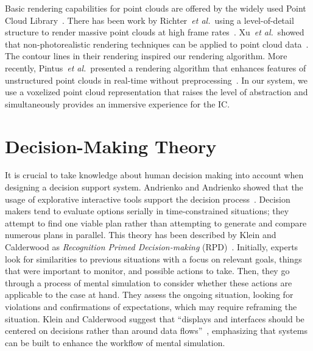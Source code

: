 \documentclass{egpubl}
\def\etal{\textit{et al.}}
\begin{document}
 Basic rendering capabilities for point clouds are offered by the widely used Point Cloud Library~\cite{Rusu11ICRA}. There has been work by Richter~\etal\ using a level-of-detail structure to render massive point clouds at high frame rates~\cite{Richter:2010:ORV:1811158.1811178}. Xu~\etal\ showed that non-photorealistic rendering techniques can be applied to point cloud data~\cite{conf/npar/XuC04}. The contour lines in their rendering inspired our rendering algorithm. More recently, Pintus~\etal\ presented a rendering algorithm that enhances features of unstructured point clouds in real-time without preprocessing~\cite{Pintus:2011:RRM:2384495.2384513}. In our system, we use a voxelized point cloud representation that raises the level of abstraction and simultaneously provides an immersive experience for the IC.



\section{Decision-Making Theory} \label{sec:theory}
It is crucial to take knowledge about human decision making into account when designing a decision support system. Andrienko and Andrienko showed that the usage of explorative interactive tools support the decision process~\cite{Andrienko:2003kv}. Decision makers tend to evaluate options serially in time-constrained situations; they attempt to find one viable plan rather than attempting to generate and compare numerous plans in parallel. This theory has been described by Klein and Calderwood as \emph{Recognition Primed Decision-making} (RPD)~\cite{KleinCalderwood}. Initially, experts look for similarities to previous situations with a focus on relevant goals, things that were important to monitor, and possible actions to take. Then, they go through a process of mental simulation to consider whether these actions are applicable to the case at hand. They assess the ongoing situation, looking for violations and confirmations of expectations, which may require reframing the situation. Klein and Calderwood suggest that ``displays and interfaces should be centered on decisions rather than around data flows''~\cite{KleinCalderwood}, emphasizing that systems can be built to enhance the workflow of mental simulation. 
\end{document}
